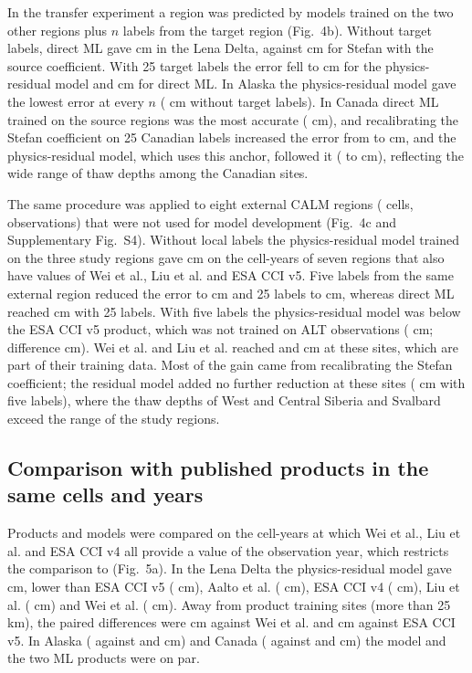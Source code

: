 In the transfer experiment a region was predicted by models trained on the two other regions plus $n$ labels from the target region (Fig.~4b). Without target labels, direct ML gave \ntlrmseLeDszero{} cm in the Lena Delta, against \ntlrmseLePzzero{} cm for Stefan with the source coefficient. With 25 target labels the error fell to \ntlrmseLeRstwfive{} cm for the physics-residual model and \ntlrmseLeDstwfive{} cm for direct ML. In Alaska the physics-residual model gave the lowest error at every $n$ (\ntlrmseAkRszero{} cm without target labels). In Canada direct ML trained on the source regions was the most accurate (\ntlrmseCaDszero{} cm), and recalibrating the Stefan coefficient on 25 Canadian labels increased the error from \ntlrmseCaPzzero{} to \ntlrmseCaPntwfive{} cm, and the physics-residual model, which uses this anchor, followed it (\ntlrmseCaRszero{} to \ntlrmseCaRstwfive{} cm), reflecting the wide range of thaw depths among the Canadian sites.

The same procedure was applied to eight external CALM regions (\nextcells{} cells, \nyrsext{} observations) that were not used for model development (Fig.~4c and Supplementary Fig.~S4). Without local labels the physics-residual model trained on the three study regions gave \nftAllRszero{} cm on the \nftrows{} cell-years of seven regions that also have values of Wei et al., Liu et al. and ESA CCI v5. Five labels from the same external region reduced the error to \nftAllRsfive{} cm and 25 labels to \nftAllRstwfive{} cm, whereas direct ML reached \nftAllDstwfive{} cm with 25 labels. With five labels the physics-residual model was below the ESA CCI v5 product, which was not trained on ALT observations (\nftAllCcifivezero{} cm; difference \nftdRsCcifivefive{} cm). Wei et al. and Liu et al. reached \nftAllWeizero{} and \nftAllLiuzero{} cm at these sites, which are part of their training data. Most of the gain came from recalibrating the Stefan coefficient; the residual model added no further reduction at these sites (\nftdRsPnfive{} cm with five labels), where the thaw depths of West and Central Siberia and Svalbard exceed the range of the study regions.

\subsection{Comparison with published products in the same cells and years}
Products and models were compared on the cell-years at which Wei et al., Liu et al. and ESA CCI v4 all provide a value of the observation year, which restricts the comparison to \nyrscc{} (Fig.~5a). In the Lena Delta the physics-residual model gave \nccLeRoall{} cm, lower than ESA CCI v5 (\nccLeCcifiveall{} cm), Aalto et al. (\nccLeAaltoall{} cm), ESA CCI v4 (\nccLeCcifourall{} cm), Liu et al. (\nccLeLiuall{} cm) and Wei et al. (\nccLeWeiall{} cm). Away from product training sites (more than 25 km), the paired differences were \ndprodLeweiRomask{} cm against Wei et al. and \ndprodLeccifiveRomask{} cm against ESA CCI v5. In Alaska (\nccAkRoall{} against \nccAkWeiall{} and \nccAkLiuall{} cm) and Canada (\nccCaRoall{} against \nccCaWeiall{} and \nccCaLiuall{} cm) the model and the two ML products were on par.

